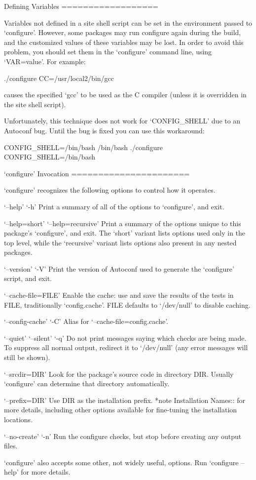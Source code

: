 \begin{DoxyVerbInclude}
Defining Variables
==================

   Variables not defined in a site shell script can be set in the
environment passed to `configure'.  However, some packages may run
configure again during the build, and the customized values of these
variables may be lost.  In order to avoid this problem, you should set
them in the `configure' command line, using `VAR=value'.  For example:

     ./configure CC=/usr/local2/bin/gcc

causes the specified `gcc' to be used as the C compiler (unless it is
overridden in the site shell script).

Unfortunately, this technique does not work for `CONFIG_SHELL' due to
an Autoconf bug.  Until the bug is fixed you can use this workaround:

     CONFIG_SHELL=/bin/bash /bin/bash ./configure CONFIG_SHELL=/bin/bash

`configure' Invocation
======================

   `configure' recognizes the following options to control how it
operates.

`--help'
`-h'
     Print a summary of all of the options to `configure', and exit.

`--help=short'
`--help=recursive'
     Print a summary of the options unique to this package's
     `configure', and exit.  The `short' variant lists options used
     only in the top level, while the `recursive' variant lists options
     also present in any nested packages.

`--version'
`-V'
     Print the version of Autoconf used to generate the `configure'
     script, and exit.

`--cache-file=FILE'
     Enable the cache: use and save the results of the tests in FILE,
     traditionally `config.cache'.  FILE defaults to `/dev/null' to
     disable caching.

`--config-cache'
`-C'
     Alias for `--cache-file=config.cache'.

`--quiet'
`--silent'
`-q'
     Do not print messages saying which checks are being made.  To
     suppress all normal output, redirect it to `/dev/null' (any error
     messages will still be shown).

`--srcdir=DIR'
     Look for the package's source code in directory DIR.  Usually
     `configure' can determine that directory automatically.

`--prefix=DIR'
     Use DIR as the installation prefix.  *note Installation Names::
     for more details, including other options available for fine-tuning
     the installation locations.

`--no-create'
`-n'
     Run the configure checks, but stop before creating any output
     files.

`configure' also accepts some other, not widely useful, options.  Run
`configure --help' for more details.

\end{DoxyVerbInclude}
 
